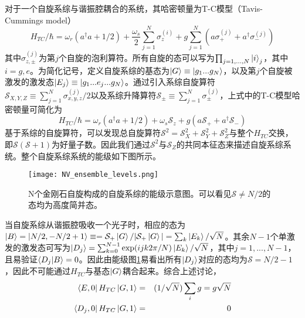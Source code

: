             对于一个自旋系综与谐振腔耦合的系统，其哈密顿量为T-C模型（Tavis-Cummings model）\cite{tavis1968exact}
            \begin{equation}
                \label{eqn:T-C_model}
                H_{TC}/\hbar = \omega_r (a^\dagger a + 1/2) + \frac{\omega_s}{2} \sum^N_{j=1} \sigma_z^{(i)} + g\sum^N_{j=1}( a \sigma_+^{(j)} + a^\dagger \sigma_-^{(j)} )
            \end{equation}
            其中$ \sigma^{(j)}_{z,\pm} $为第$j$个自旋的泡利算符。所有自旋的态可以写为$\prod_{j=1,...,N} \ket{i}_j $，其中$i=g,e$。为简化记号，定义自旋系综的基态为$\ket G \equiv \ket{g_1 ... g_N} $，以及第$j$个自旋被激发的激发态$\ket {E_j} \equiv \ket{g_1...e_j...g_N} $。通过引入系综自旋算符$ \mathcal S_{X,Y,Z} \equiv \sum^N_{j=1} \sigma^{(j)}_{x,y,z}/2 $以及系综升降算符$ \mathcal S_{\pm} \equiv \sum^N_{j=1} \sigma^{(j)}_{\pm} $，上式中的T-C模型哈密顿量可简化为
            \begin{equation}
                \label{eqn:TC_model_simplified}
                H_{TC}/\hbar = \omega_r (a^\dagger a + 1/2) + \omega_s \mathcal S_z + g( a \mathcal S_+ + a^\dagger \mathcal S_- )
            \end{equation}
            基于系综的自旋算符，可以发现总自旋算符$ \mathcal S^2  = \mathcal S_X^2 + \mathcal S_Y^2 + \mathcal S_Z^2 $与整个$H_{TC}$交换，即$ \mathcal S(\mathcal S+1) $为好量子数。因此我们通过$\mathcal S^2$与$\mathcal S_Z$的共同本征态来描述自旋系综系统。整个自旋系综系统的能级如下图所示。


            
            \begin{figure}[h]
                \centering
                \texttt{[image: NV\_ensemble\_levels.png]}
                \caption{N个金刚石自旋构成的自旋系综的能级示意图\cite{grezes2016towards}。可以看见$\mathcal S \neq N/2 $的态均为高度简并态。}
                \label{fig:NV_ensemble_levels}
            \end{figure}




            当自旋系综从谐振腔吸收一个光子时，相应的态为$\ket B = \ket{N/2, -N/2 + 1} \equiv = \mathcal S_+ \ket G/|\mathcal S_+ \ket G| = \sum_k \ket{E_k}/\sqrt N $。其余$N-1$个单激发的激发态可写为$\ket{D_j} = \sum^{N-1}_{k=0} \exp(ijk2\pi/N)\ket{E_k}/\sqrt N $，其中$j=1,...,N-1$，且易验证$\braket{D_j|B} = 0 $。因此由能级图\ref{fig:NV_ensemble_levels}易看出所有$\ket{D_j}$对应的态均为$\mathcal S = N/2-1$，因此不可能通过$H_{TC}$与基态$\ket{G}$耦合起来。综合上述讨论，
            \begin{eqnarray}
                \bra{E,0} H_{TC} \ket{G,1} &=&(1/\sqrt N)\sum_i g = g\sqrt N\\
                \bra{D_j,0} H_{TC}\ket{G,1} &=& 0
            \end{eqnarray}
            
